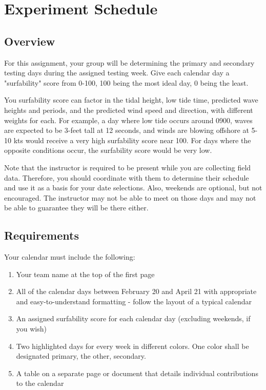 \documentclass[
	letterpaper, %
	fontsize=10pt, %
	twoside=true, %
	numbers=noenddot, %
]{kaobook}
\begin{document}
\chapter*{Experiment Schedule}

\section*{Overview}
For this assignment, your group will be determining the primary and secondary testing days during the assigned testing week.
Give each calendar day a "surfability" score from 0-100, 100 being the most ideal day, 0 being the least. 

You surfability score can factor in the tidal height, low tide time, predicted wave heights and periods, and the predicted wind speed and direction, with different weights for each.
For example, a day where low tide occurs around 0900, waves are expected to be 3-feet tall at 12 seconds, and winds are blowing offshore at 5-10 kts would receive a very high surfability score near 100.
For days where the opposite conditions occur, the surfability score would be very low.

Note that the instructor is required to be present while you are collecting field data.
Therefore, you should coordinate with them to determine their schedule and use it as a basis for your date selections.
Also, weekends are optional, but not encouraged.
The instructor may not be able to meet on those days and may not be able to guarantee they will be there either.


\section*{Requirements}
Your calendar must include the following:

\begin{enumerate}
	\item Your team name at the top of the first page
	\item All of the calendar days between February 20 and April 21 with appropriate and easy-to-understand formatting - follow the layout of a typical calendar
	\item An assigned surfability score for each calendar day (excluding weekends, if you wish)
	\item Two highlighted days for every week in different colors. One color shall be designated primary, the other, secondary.
	\item A table on a separate page or document that details individual contributions to the calendar
\end{enumerate}
\end{document}
